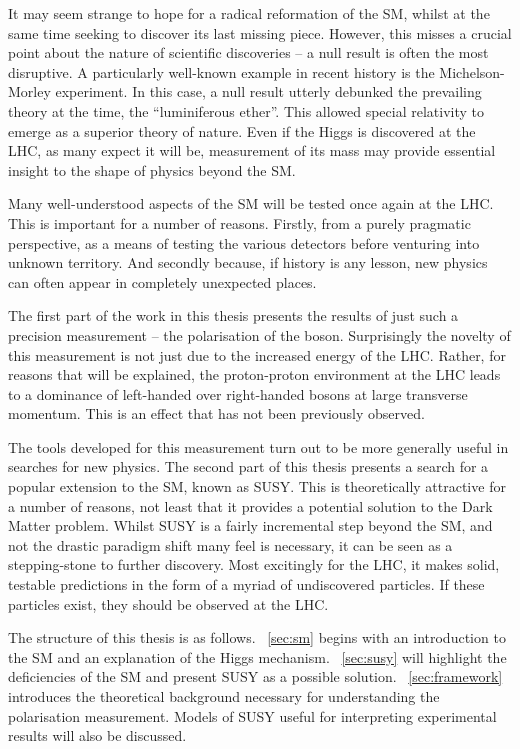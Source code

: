 It may seem strange to hope for a radical reformation of the \ac{SM}, whilst at
the same time seeking to discover its last missing piece. However, this misses a
crucial point about the nature of scientific discoveries -- a null result is
often the most disruptive. A particularly well-known example in recent history
is the Michelson-Morley experiment. In this case, a null result utterly debunked
the prevailing theory at the time, the ``luminiferous ether''. This allowed
special relativity to emerge as a superior theory of nature. Even if the Higgs
is discovered at the \ac{LHC}, as many expect it will be, measurement of its
mass may provide essential insight to the shape of physics beyond the \ac{SM}.

Many well-understood aspects of the \ac{SM} will be tested once again at the
\ac{LHC}. This is important for a number of reasons. Firstly, from a purely
pragmatic perspective, as a means of testing the various detectors before
venturing into unknown territory. And secondly because, if history is any
lesson, new physics can often appear in completely unexpected places.

The first part of the work in this thesis presents the results of just such a
precision measurement -- the polarisation of the \PW boson. Surprisingly the
novelty of this measurement is not just due to the increased energy of the
\ac{LHC}. Rather, for reasons that will be explained, the proton-proton
environment at the \ac{LHC} leads to a dominance of left-handed over
right-handed \PW bosons at large transverse momentum. This is an effect that has
not been previously observed.

The tools developed for this measurement turn out to be more generally useful in
searches for new physics. The second part of this thesis presents a search for a
popular extension to the \ac{SM}, known as \acf{SUSY}. This is theoretically
attractive for a number of reasons, not least that it provides a potential
solution to the Dark Matter problem. Whilst \ac{SUSY} is a fairly incremental
step beyond the \ac{SM}, and not the drastic paradigm shift many feel is
necessary, it can be seen as a stepping-stone to further discovery. Most
excitingly for the \ac{LHC}, it makes solid, testable predictions in the form of
a myriad of undiscovered particles. If these particles exist, they should be
observed at the \ac{LHC}.

The structure of this thesis is as follows. \chap~\ref{sec:sm} begins with an
introduction to the \ac{SM} and an explanation of the Higgs
mechanism. \chap~\ref{sec:susy} will highlight the deficiencies of the \ac{SM}
and present \ac{SUSY} as a possible solution. \chap~\ref{sec:framework}
introduces the theoretical background necessary for understanding the \PW
polarisation measurement. Models of \ac{SUSY} useful for interpreting
experimental results will also be discussed.

